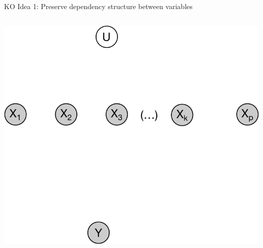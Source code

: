 \documentclass[
  ignorenonframetext,
  aspectratio=169]{beamer}
\begin{document}
\begin{frame}{KO Idea 1: Preserve dependency structure between
variables}
\begin{columns}[T]
\begin{column}{.45\textwidth}
{\begin{center}\includegraphics[height=.58\textheight]{Vis/Knockoff2} \end{center}


}

\normalsize


\scriptsize


\normalsize
\end{column}
\end{columns}
\end{frame}
\end{document}
